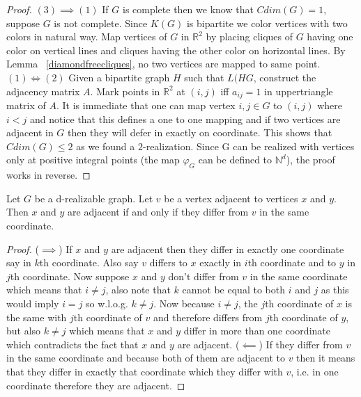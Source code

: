 \documentclass[12pt,a4paper,titlepage,openany]{report}
\begin{document}
\begin{proof}
$(3)\implies (1)$ If $G$ is complete then we know that $Cdim(G)=1$, suppose $G$ is not complete. Since $K(G)$ is bipartite we color vertices with two colors in natural way. Map vertices of $G$ in $\mathbb{R}^2$ by placing cliques of $G$ having one color on vertical lines and cliques having the other color on horizontal lines. By Lemma ~\ref{diamondfreecliques}, no two vertices are mapped to same point.
\newline
$(1)\iff (2)$ Given a bipartite graph $H$ such that $L(HG$, construct the adjacency matrix $A$. Mark points in $\mathbb{R}^2$ at $(i, j)$ iff $a_{ij} = 1$ in uppertriangle matrix of $A$. It is immediate that one can map vertex ${i,j}\in G$ to $(i,j)$ where $i<j$ and notice that this defines a one to one mapping and if two vertices are adjacent in $G$ then they will defer in exactly on coordinate. This shows that $Cdim(G)\leq 2$ as we found a $2$-realization.\newline
Since G can be realized with vertices only at positive integral points (the map $\varphi_G$ can be defined to $\mathbb{N}^d$), the proof works in reverse.
\end{proof}

\begin{lemma}\label{xyv adjacent}
Let $G$ be a d-realizable graph. Let $v$ be a vertex adjacent to vertices $x$ and $y$. Then $x$ and $y$ are adjacent if and only if they differ from $v$ in the same coordinate.
\end{lemma}
\begin{proof}
($\implies$) If $x$ and $y$ are adjacent then they differ in exactly one coordinate say in $k$th coordinate. Also say $v$ differs to $x$ exactly in $i$th coordinate and to $y$ in $j$th coordinate. Now suppose $x$ and $y$ don't differ from $v$ in the same coordinate which means that $i\neq j$, also note that $k$ cannot be equal to both $i$ and $j$ as this would imply $i=j$ so w.l.o.g. $k\neq j$. Now because $i\neq j$, the $j$th coordinate of $x$ is the same with $j$th coordinate of $v$ and therefore differs from $j$th coordinate of $y$, but also $k\neq j$ which means that $x$ and $y$ differ in more than one coordinate which contradicts the fact that $x$ and $y$ are adjacent.\newline
($\impliedby$) If they differ from $v$ in the same coordinate and because both of them are adjacent to $v$ then it means that they differ in exactly that coordinate which they differ with $v$, i.e. in one coordinate therefore they are adjacent.
\end{proof}
\end{document}
